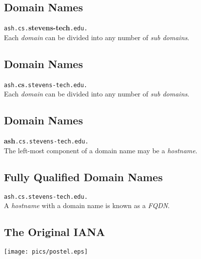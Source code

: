 \documentclass[xga]{xdvislides}
\begin{document}
\subsection{Domain Names}
\vspace{.5in}
\begin{center}
	\Huge
	\verb+ash.cs.+{\bf stevens-tech}\verb+.edu.+ \\
	\vspace{.5in}
	Each {\em domain} can be divided into any number of {\em sub domains}.
\end{center}
\Normalsize

\subsection{Domain Names}
\vspace{.5in}
\begin{center}
	\Huge
	\verb+ash.+{\bf cs}\verb+.stevens-tech.edu.+ \\
	\vspace{.5in}
	Each {\em domain} can be divided into any number of {\em sub domains}.
\end{center}
\Normalsize

\subsection{Domain Names}
\vspace{.5in}
\begin{center}
	\Huge
	{\bf ash}\verb+.cs.stevens-tech.edu.+ \\
	\vspace{.5in}
	The left-most component of a domain name may be a {\em hostname}.
\end{center}
\Normalsize

\subsection{Fully Qualified Domain Names}
\vspace{.5in}
\begin{center}
	\Huge
	\verb+ash.cs.stevens-tech.edu.+ \\
	\vspace{.5in}
	A {\em hostname} with a domain name is known as a {\em FQDN}.
\end{center}
\Normalsize

\subsection{The Original IANA}
\vspace*{\fill}
\begin{center}
	\texttt{[image: pics/postel.eps]}
\end{center}
\vspace*{\fill}
\end{document}
